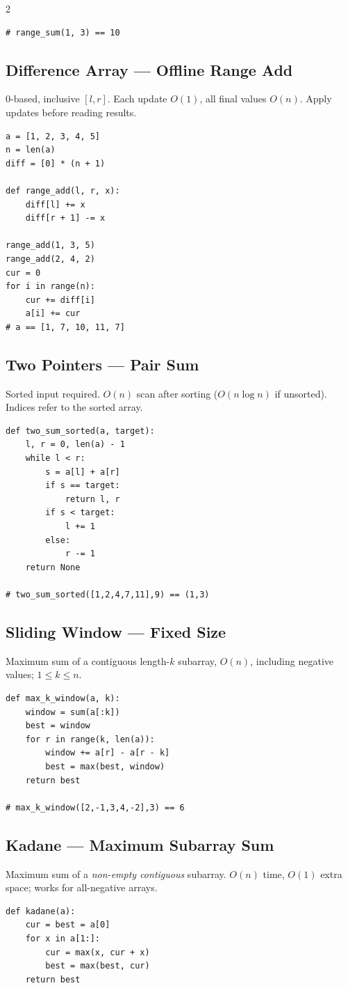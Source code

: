 \documentclass[9pt,a4paper]{extarticle}
\begin{document}
\begin{multicols}{2}
\begin{lstlisting}
# range_sum(1, 3) == 10
\end{lstlisting}

\subsection{Difference Array --- Offline Range Add}
0-based, inclusive $[l,r]$. Each update $O(1)$, all final values $O(n)$. Apply updates before reading results.
\begin{lstlisting}
a = [1, 2, 3, 4, 5]
n = len(a)
diff = [0] * (n + 1)

def range_add(l, r, x):
    diff[l] += x
    diff[r + 1] -= x

range_add(1, 3, 5)
range_add(2, 4, 2)
cur = 0
for i in range(n):
    cur += diff[i]
    a[i] += cur
# a == [1, 7, 10, 11, 7]
\end{lstlisting}

\subsection{Two Pointers --- Pair Sum}
Sorted input required. $O(n)$ scan after sorting ($O(n\log n)$ if unsorted). Indices refer to the sorted array.
\begin{lstlisting}
def two_sum_sorted(a, target):
    l, r = 0, len(a) - 1
    while l < r:
        s = a[l] + a[r]
        if s == target:
            return l, r
        if s < target:
            l += 1
        else:
            r -= 1
    return None

# two_sum_sorted([1,2,4,7,11],9) == (1,3)
\end{lstlisting}

\subsection{Sliding Window --- Fixed Size}
Maximum sum of a contiguous length-$k$ subarray, $O(n)$, including negative values; $1\le k\le n$.
\begin{lstlisting}
def max_k_window(a, k):
    window = sum(a[:k])
    best = window
    for r in range(k, len(a)):
        window += a[r] - a[r - k]
        best = max(best, window)
    return best

# max_k_window([2,-1,3,4,-2],3) == 6
\end{lstlisting}

\subsection{Kadane --- Maximum Subarray Sum}
Maximum sum of a \emph{non-empty contiguous} subarray. $O(n)$ time, $O(1)$ extra space; works for all-negative arrays.
\begin{lstlisting}
def kadane(a):
    cur = best = a[0]
    for x in a[1:]:
        cur = max(x, cur + x)
        best = max(best, cur)
    return best


\end{lstlisting}
\end{multicols}
\end{document}
